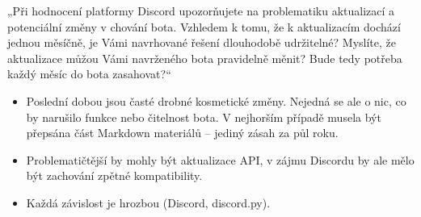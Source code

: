 \documentclass[FM]{tulpresentation} %
\begin{document}
	\begin{frame}
		\bigskip
		„Při hodnocení platformy Discord upozorňujete na problematiku aktualizací a potenciální změny v chování
		bota. Vzhledem k tomu, že k aktualizacím dochází jednou měsíčně, je Vámi navrhované řešení dlouhodobě
		udržitelné? Myslíte, že aktualizace můžou Vámi navrženého bota pravidelně měnit? Bude tedy potřeba každý
		měsíc do bota zasahovat?“
		\bigskip
		\begin{itemize}
			\item Poslední dobou jsou časté drobné kosmetické změny. Nejedná se ale o nic, co by narušilo funkce nebo čitelnost bota. V nejhorším případě musela být přepsána část Markdown materiálů – jediný zásah za půl roku.
			\item Problematičtější by mohly být aktualizace API, v zájmu Discordu by ale mělo být zachování zpětné kompatibility.
			\item Každá závislost je hrozbou (Discord, discord.py).
		\end{itemize}
	\end{frame}
	
\end{document}

